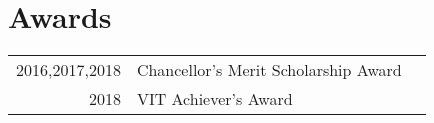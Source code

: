\documentclass[]{deedy-resume-openfont}
\begin{document}
\begin{minipage}[t]{0.66\textwidth}

\section{Awards} 
\begin{tabular}{rll}
2016,2017,2018	     & Chancellor's Merit Scholarship Award\\
2018	     & VIT Achiever's Award\\
\end{tabular}

\sectionsep



\end{minipage} 
\end{document}
